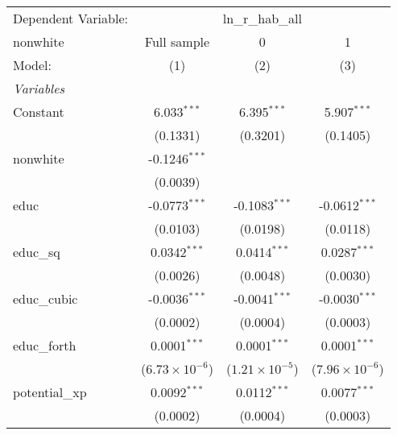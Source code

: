 
\begingroup
\centering
\begin{tabular}{lccc}
   \tabularnewline \midrule \midrule
   Dependent Variable: & \multicolumn{3}{c}{ln\_r\_hab\_all}\\
   nonwhite                        & Full sample             & 0                       & 1 \\   
   Model:                          & (1)                     & (2)                     & (3)\\  
   \midrule
   \emph{Variables}\\
   Constant                        & 6.033$^{***}$           & 6.395$^{***}$           & 5.907$^{***}$\\   
                                   & (0.1331)                & (0.3201)                & (0.1405)\\   
   nonwhite                        & -0.1246$^{***}$         &                         &   \\   
                                   & (0.0039)                &                         &   \\   
   educ                            & -0.0773$^{***}$         & -0.1083$^{***}$         & -0.0612$^{***}$\\   
                                   & (0.0103)                & (0.0198)                & (0.0118)\\   
   educ\_sq                        & 0.0342$^{***}$          & 0.0414$^{***}$          & 0.0287$^{***}$\\   
                                   & (0.0026)                & (0.0048)                & (0.0030)\\   
   educ\_cubic                     & -0.0036$^{***}$         & -0.0041$^{***}$         & -0.0030$^{***}$\\   
                                   & (0.0002)                & (0.0004)                & (0.0003)\\   
   educ\_forth                     & 0.0001$^{***}$          & 0.0001$^{***}$          & 0.0001$^{***}$\\   
                                   & ($6.73\times 10^{-6}$)  & ($1.21\times 10^{-5}$)  & ($7.96\times 10^{-6}$)\\    
   potential\_xp                   & 0.0092$^{***}$          & 0.0112$^{***}$          & 0.0077$^{***}$\\   
                                   & (0.0002)                & (0.0004)                & (0.0003)\\   

\end{tabular}
